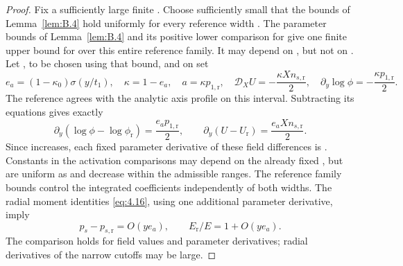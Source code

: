 \begin{proof}
%
Fix a sufficiently large finite . Choose
 sufficiently small that the bounds of Lemma~\ref{lem:B.4}
hold uniformly for every reference width . The parameter bounds of
Lemma~\ref{lem:B.4} and its positive lower comparison for  give one finite upper bound
 for  over this entire reference family. It may depend on
, but not on . Let
, to be chosen using that bound, and on
 set
\begin{equation}
  e_a=(1-\kappa_0)\sigma(y/t_1),\quad
  \kappa=1-e_a,\quad
  a=\kappa p_{1,\mathrm r},\quad
  \mathcal D_XU=-\frac{\kappa Xn_{s,\mathrm r}}{2},\quad
  \partial_y\log\phi=-\frac{\kappa p_{1,\mathrm r}}{2}.
\tag{B.26}\label{eq:B.26}
\end{equation}
The reference agrees with the analytic axis profile on this interval. Subtracting its equations
gives exactly
\begin{equation}
  \partial_y(\log\phi-\log\phi_{\mathrm r})=\frac{e_ap_{1,\mathrm r}}{2},
  \qquad
  \partial_y(U-U_{\mathrm r})=\frac{e_aXn_{s,\mathrm r}}{2}.
\tag{B.27}\label{eq:B.27}
\end{equation}
Since  increases, each fixed parameter derivative of these field differences is
. Constants in the activation comparisons may depend on the already fixed
, but are uniform as  and
 decrease within the admissible ranges. The reference family bounds
control the integrated coefficients independently of both widths. The radial moment identities
\eqref{eq:4.16}, using one additional parameter derivative, imply
\begin{equation}
  p_s-p_{s,\mathrm r}=O(ye_a),
  \qquad
  E_{\mathrm r}/E=1+O(ye_a).
\tag{B.28}\label{eq:B.28}
\end{equation}
The comparison holds for field values and parameter derivatives; radial derivatives of the
narrow cutoffs may be large.


\end{proof}
